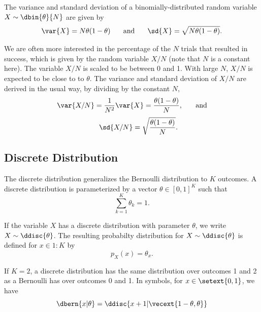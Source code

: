 The variance and standard deviation of a binomially-distributed random
variable $X \sim \dbin{\theta}{N}$ are given by
%
\begin{equation}
\hfill
\var{X} = N \theta (1 - \theta)
\hspace*{0.25in}
\mbox{and}
\hspace*{0.25in}
\sd{X} = \sqrt{N \theta (1 - \theta)}.
\hfill
\end{equation}
%

We are often more interested in the percentage of the $N$ trials that
resulted in success, which is given by the random variable $X/N$ (note
that $N$ is a constant here).  The variable $X/N$ is scaled to be
between 0 and 1.  With large $N$, $X/N$ is expected to be close to to
$\theta$.  The variance and standard deviation of $X/N$ are derived in
the usual way, by dividing by the constant $N$,
%
\begin{equation}
\var{X / N}
= \frac{1}{N^2} \var{X} 
= \frac{\theta (1 - \theta)}{N},
\hspace*{0.25in}
\mbox{and}
\end{equation}
%
\begin{equation}
\hspace*{0.25in}
\sd{X/N} = \sqrt{\frac{\theta (1-\theta)}{N}}.
\end{equation}


\subsection{Discrete Distribution}

The discrete distribution generalizes the Bernoulli distribution to
$K$ outcomes.  A discrete distribution is parameterized by a vector
$\theta \in [0,1]^K$ such that
%
\begin{equation}
\sum_{k=1}^K \theta_k = 1.
\end{equation}

If the variable $X$ has a discrete distribution with parameter
$\theta$, we write $X \sim \ddisc{\theta}$.  The resulting probabilty
distribution for $X \sim \ddisc{\theta}$ is defined for $x \in 1{:}K$
by
%
\begin{equation}
p_X(x) = \theta_x.
\end{equation}
%

If $K=2$, a discrete distribution has the same distribution
over outcomes 1 and 2 as a Bernoulli has over outcomes 0 and 1.  
In symbols, for $x \in \setext{0,1}$, we have
%
\begin{equation}
\dbern{x|\theta} = \ddisc{x+1|\vecext{1-\theta,\theta}}
\end{equation}

